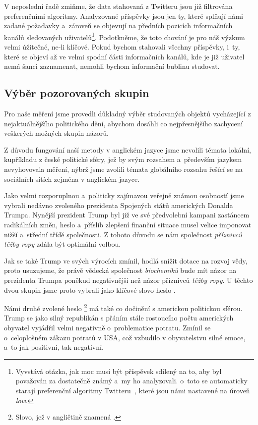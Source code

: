 \documentclass[12pt, a4paper]{article}
\numberwithin{equation}{section} 	%
\begin{document}
V neposlední řadě zmiňme, že data stahovaná z Twitteru jsou již filtrována preferenčními algoritmy. Analyzované příspěvky jsou jen ty, které splňují námi zadané požadavky a~zároveň se objevují na předních pozicích informačních kanálů sledovaných uživatelů\footnote{Vyvstává otázka, jak moc musí být příspěvek sdílený na to, aby byl považován za dostatečně známý a~my ho analyzovali. o~toto se automaticky starají preferenční algoritmy Twitteru~\cite{twitterAPI}, které jsou námi nastavené na úroveň \textit{low}.}. Podotkněme, že toto chování je pro náš výzkum velmi úžitečné, ne-li klíčové. Pokud bychom stahovali všechny příspěvky, i~ty, které se objeví až ve velmi spodní části informačních kanálů, kde je již uživatel nemá šanci zaznamenat, nemohli bychom informační bublinu studovat.

\subsection{Výběr pozorovaných skupin}
\noindent Pro naše měření jsme provedli důkladný výběr studovaných objektů vycházející z nejaktuálnějšího politického dění, abychom dosáhli co nejpřesnějšího zachycení veškerých možných skupin názorů.

Z důvodu fungování naší metody v anglickém jazyce jsme nevolili témata lokální, kupříkladu z české politické sféry, jež by svým rozsahem a~především jazykem nevyhovovala měření, nýbrž jsme zvolili témata globálního rozsahu řešící se na sociálních sítích zejména v anglickém jazyce.

Jako velmi rozporuplnou a~politicky zajímavou veřejně známou osobností jsme vybrali nedávno zvoleného prezidenta Spojených států amerických Donalda Trumpa. Nynější prezident Trump byl již ve své předvolební kampani zastáncem radikálních změn, heslo  a~příslib zlepšení finanční situace musel velice imponovat nižší a~střední třídě společnosti. Z tohoto důvodu se nám společnost \textit{příznivců těžby ropy} zdála být optimální volbou.

Jak se také Trump ve svých výrocích zmínil, hodlá snížit dotace na rozvoj vědy, proto usuzujeme, že právě vědecká společnost \textit{biochemiků} bude mít názor na prezidenta Trumpa poněkud negativnější než názor příznivců \textit{těžby ropy}. U těchto dvou skupin jsme proto vybrali jako klíčové slovo heslo \textit{}.

Námi druhé zvolené heslo \textit{}\footnote{Slovo, jež v angličtině znamená \textit{}.} má také co dočinění s americkou politickou sférou. Trump se jako silný republikán s přáním stále rostoucího počtu amerických obyvatel vyjádřil velmi negativně o~problematice potratu. Zmínil se o~celoplošném zákazu potratů v USA, což vzbudilo v obyvatelstvu silné emoce, a~to jak positivní, tak negativní.
\end{document}
